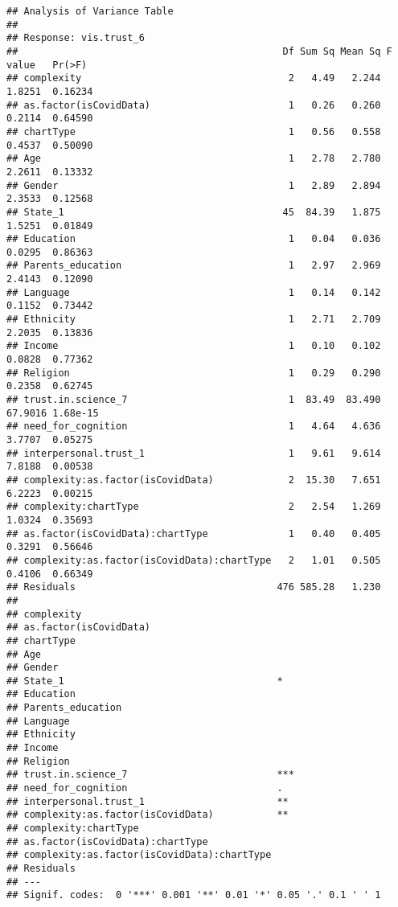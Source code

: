 \documentclass[
]{article}
\begin{document}
\begin{verbatim}
## Analysis of Variance Table
## 
## Response: vis.trust_6
##                                              Df Sum Sq Mean Sq F value   Pr(>F)
## complexity                                    2   4.49   2.244  1.8251  0.16234
## as.factor(isCovidData)                        1   0.26   0.260  0.2114  0.64590
## chartType                                     1   0.56   0.558  0.4537  0.50090
## Age                                           1   2.78   2.780  2.2611  0.13332
## Gender                                        1   2.89   2.894  2.3533  0.12568
## State_1                                      45  84.39   1.875  1.5251  0.01849
## Education                                     1   0.04   0.036  0.0295  0.86363
## Parents_education                             1   2.97   2.969  2.4143  0.12090
## Language                                      1   0.14   0.142  0.1152  0.73442
## Ethnicity                                     1   2.71   2.709  2.2035  0.13836
## Income                                        1   0.10   0.102  0.0828  0.77362
## Religion                                      1   0.29   0.290  0.2358  0.62745
## trust.in.science_7                            1  83.49  83.490 67.9016 1.68e-15
## need_for_cognition                            1   4.64   4.636  3.7707  0.05275
## interpersonal.trust_1                         1   9.61   9.614  7.8188  0.00538
## complexity:as.factor(isCovidData)             2  15.30   7.651  6.2223  0.00215
## complexity:chartType                          2   2.54   1.269  1.0324  0.35693
## as.factor(isCovidData):chartType              1   0.40   0.405  0.3291  0.56646
## complexity:as.factor(isCovidData):chartType   2   1.01   0.505  0.4106  0.66349
## Residuals                                   476 585.28   1.230                 
##                                                
## complexity                                     
## as.factor(isCovidData)                         
## chartType                                      
## Age                                            
## Gender                                         
## State_1                                     *  
## Education                                      
## Parents_education                              
## Language                                       
## Ethnicity                                      
## Income                                         
## Religion                                       
## trust.in.science_7                          ***
## need_for_cognition                          .  
## interpersonal.trust_1                       ** 
## complexity:as.factor(isCovidData)           ** 
## complexity:chartType                           
## as.factor(isCovidData):chartType               
## complexity:as.factor(isCovidData):chartType    
## Residuals                                      
## ---
## Signif. codes:  0 '***' 0.001 '**' 0.01 '*' 0.05 '.' 0.1 ' ' 1
\end{verbatim}
\end{document}
